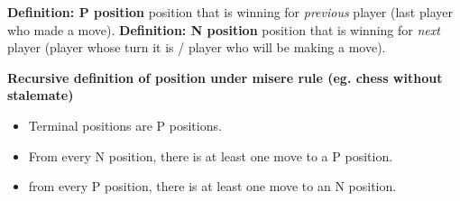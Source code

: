\documentclass[14pt]{report}
\newcommand*{\start}[1]{\leavevmode\newline \textbf{#1} }
\begin{document}
\start{Definition: P position} position that is winning for \emph{previous} player (last player who made a move).
\start{Definition: N position} position that is winning for \emph{next} player (player whose turn it is / player who will be making a move).

\start{Recursive definition of position under misere rule (eg. chess without stalemate)}
\begin{itemize}
    \item Terminal positions are P positions.
    \item From every N position, there is at least one move to a P position.
    \item from every P position, there is at least one move to an N position.
\end{itemize}
\end{document}
